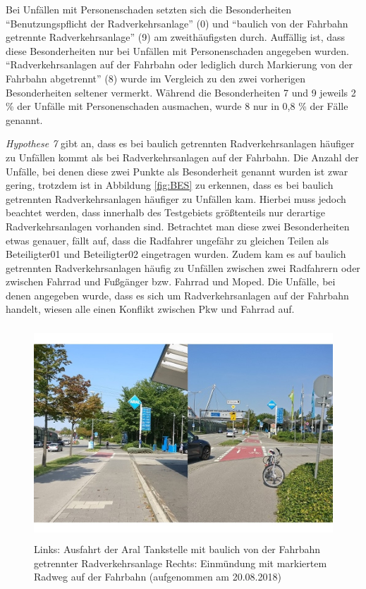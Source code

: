 Bei Unfällen mit Personenschaden setzten sich die Besonderheiten \enquote{Benutzungspflicht der Radverkehrsanlage} (0) und \enquote{baulich von der Fahrbahn getrennte Radverkehrsanlage} (9) am zweithäufigsten durch. Auffällig ist, dass diese Besonderheiten nur bei Unfällen mit Personenschaden angegeben wurden. \enquote{Radverkehrsanlagen auf der Fahrbahn oder lediglich durch Markierung von der Fahrbahn abgetrennt} (8) wurde im Vergleich zu den zwei vorherigen Besonderheiten seltener vermerkt. Während die Besonderheiten 7 und 9 jeweils 2 \% der Unfälle mit Personenschaden ausmachen, wurde 8 nur in 0,8 \% der Fälle genannt.

\textit{Hypothese 7} gibt an, dass es bei baulich getrennten Radverkehrsanlagen häufiger zu Unfällen kommt als bei Radverkehrsanlagen auf der Fahrbahn. Die Anzahl der Unfälle, bei denen diese zwei Punkte als Besonderheit genannt wurden ist zwar gering, trotzdem ist in Abbildung \ref{fig:BES} zu erkennen, dass es bei baulich getrennten Radverkehrsanlagen häufiger zu Unfällen kam. Hierbei muss jedoch beachtet werden, dass innerhalb des Testgebiets größtenteils nur derartige Radverkehrsanlagen vorhanden sind. Betrachtet man diese zwei Besonderheiten etwas genauer, fällt auf, dass die Radfahrer ungefähr zu gleichen Teilen als Beteiligter01 und Beteiligter02 eingetragen wurden. Zudem kam es auf baulich getrennten Radverkehrsanlagen häufig zu Unfällen zwischen zwei Radfahrern oder zwischen Fahrrad und Fußgänger bzw. Fahrrad und Moped. Die Unfälle, bei denen angegeben wurde, dass es sich um Radverkehrsanlagen auf der Fahrbahn handelt, wiesen alle einen Konflikt zwischen Pkw und Fahrrad auf.

\begin{savenotes}
	\begin{figure}[H]
		\centering
		\includegraphics[width=12cm,height=8cm]{figures/Lyonel_Feininger}
		\caption[Ausfahrt Aral Tankstelle und Einmündung Lyonel-Feininger-Straße]{Links: Ausfahrt der Aral Tankstelle mit baulich von der Fahrbahn getrennter Radverkehrsanlage Rechts: Einmündung mit markiertem Radweg auf der Fahrbahn (aufgenommen am 20.08.2018)}\label{fig:Lyonel-Feininger}
	\end{figure}
\end{savenotes}


